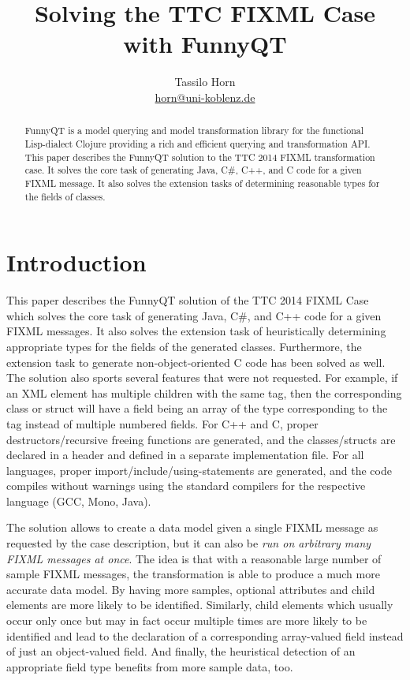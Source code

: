 \documentclass[submission]{eptcs}
\title{Solving the TTC FIXML Case with FunnyQT}
\author{Tassilo Horn\\
  \href{mailto:horn@uni-koblenz.de}{horn@uni-koblenz.de}}
\begin{document}
\maketitle

\begin{abstract}
  FunnyQT is a model querying and model transformation library for the
  functional Lisp-dialect Clojure providing a rich and efficient querying and
  transformation API.  This paper describes the FunnyQT solution to the TTC
  2014 FIXML transformation case.  It solves the core task of generating Java,
  C\#, C++, and C code for a given FIXML message.  It also solves the extension
  tasks of determining reasonable types for the fields of classes.
\end{abstract}


\section{Introduction}
\label{sec:introduction}

This paper describes the FunnyQT solution of the TTC 2014 FIXML
Case~\cite{fixml-case-desc} which solves the core task of generating Java, C\#,
and C++ code for a given FIXML messages.  It also solves the extension task of
heuristically determining appropriate types for the fields of the generated
classes.  Furthermore, the extension task to generate non-object-oriented C
code has been solved as well.  The solution also sports several features that
were not requested.  For example, if an XML element has multiple children with
the same tag, then the corresponding class or struct will have a field being an
array of the type corresponding to the tag instead of multiple numbered fields.
For C++ and C, proper destructors/recursive freeing functions are generated,
and the classes/structs are declared in a header and defined in a separate
implementation file.  For all languages, proper import/include/using-statements
are generated, and the code compiles without warnings using the standard
compilers for the respective language (GCC, Mono, Java).

The solution allows to create a data model given a single FIXML message as
requested by the case description, but it can also be \emph{run on arbitrary
  many FIXML messages at once}.  The idea is that with a reasonable large
number of sample FIXML messages, the transformation is able to produce a much
more accurate data model.  By having more samples, optional attributes and
child elements are more likely to be identified.  Similarly, child elements
which usually occur only once but may in fact occur multiple times are more
likely to be identified and lead to the declaration of a corresponding
array-valued field instead of just an object-valued field.  And finally, the
heuristical detection of an appropriate field type benefits from more sample
data, too.
\end{document}
